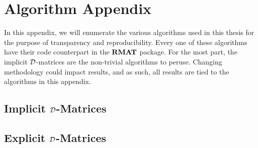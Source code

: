 
\chapter{Algorithm Appendix}

In this appendix, we will enumerate the various algorithms used in this thesis for the purpose of transparency and reproducibility. Every one of these algorithms have their code counterpart in the ${\textbf{RMAT}}$ package. For the most part, the implicit $\mathcal{D}$-matrices are the non-trivial algorithms to peruse. Changing methodology could impact results, and as such, all results are tied to the algorithms in this appendix.

\section{Implicit $\mathcal{D}$-Matrices}

\ALGstochrow

\ALGstoch

\ALGstochsymm


\ALGerdos

\section{Explicit $\mathcal{D}$-Matrices}

\ALGexplicit

\ALGbeta

